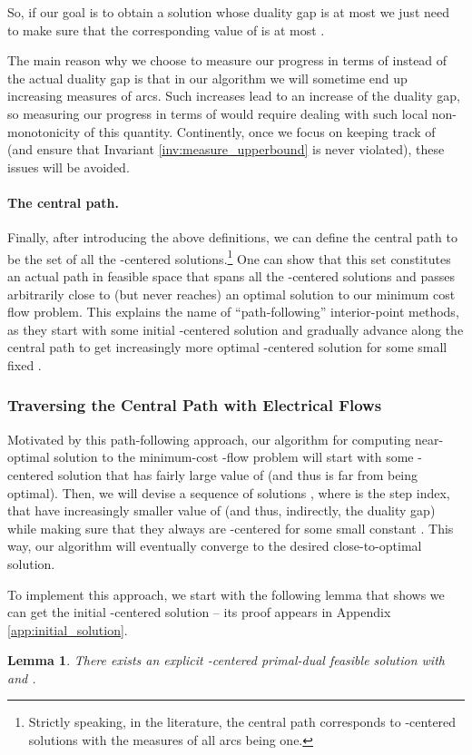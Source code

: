 \documentclass[11pt, letterpaper]{article}
\newtheorem{lemma}[theorem]{Lemma}
\begin{document}
So, if our goal is to obtain a solution whose duality gap is at most  we just need to make sure that the corresponding value of  is at most . 

The main reason why we choose to measure our progress in terms of  instead of the actual duality gap  is that in our algorithm we will sometime end up increasing measures of arcs. Such increases lead to an increase of the duality gap, so measuring our progress in terms of  would require dealing with such local non-monotonicity of this quantity. Continently, once we focus on keeping track of   (and ensure that Invariant \ref{inv:measure_upperbound} is never violated), these issues will be avoided.


\paragraph{The central path.} Finally, after introducing the above definitions, we can define the central path to be the set of all the -centered solutions.\footnote{Strictly speaking, in the literature, the central path corresponds to -centered solutions with the measures of all arcs being one.} One can show that this set constitutes an actual path in feasible space that spans all the -centered solutions and passes arbitrarily close to (but never reaches) an optimal solution to our minimum cost flow problem. This explains the name of ``path-following'' interior-point methods, as they start with some initial -centered solution and gradually advance along the central path to get increasingly more optimal -centered solution for some small fixed .


 \subsubsection*{Traversing the Central Path with Electrical Flows}

Motivated by this path-following approach, our algorithm for computing near-optimal solution to the minimum-cost -flow problem will start with some -centered solution  that has fairly large value of  (and thus is far from being optimal). Then, we will devise a sequence of solutions , where  is the step index, that have increasingly smaller value of  (and thus, indirectly, the duality gap) while making sure that they always are -centered for some small constant . This way, our algorithm will eventually converge to the desired close-to-optimal solution.

To implement this approach, we start with the following lemma that shows we can get the initial -centered solution  -- its proof appears in Appendix \ref{app:initial_solution}. 
\begin{lemma}
\label{lem:initial_solution}
There exists an explicit -centered primal-dual feasible solution  with  and . 
\end{lemma}
\end{document}
